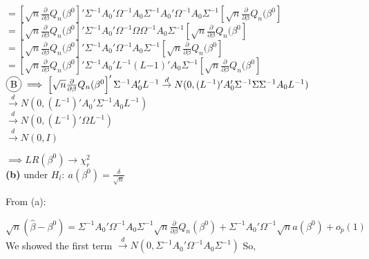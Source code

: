 \documentclass[11pt]{article}
\theoremstyle{definition}
\newcommand*\circled[1]{\tikz[baseline=(char.base)]{
            \node[shape=circle,draw,inner sep=2pt] (char) {#1};}}
\def\indist{\stackrel{d}{\rightarrow}}
\begin{document}
$=\left[\sqrt{n}\frac{\partial}{\partial \beta}Q_{n}(\beta^{0}\right]'\Sigma^{-1}A_{0}'\Omega^{-1}A_{0}\Sigma^{-1}A_{0}'\Omega^{-1}A_{0}\Sigma^{-1}\left[\sqrt{n}\frac{\partial}{\partial \beta}Q_{n}(\beta^{0}\right]$ \\

$=\left[\sqrt{n}\frac{\partial}{\partial \beta}Q_{n}(\beta^{0}\right]'\Sigma^{-1}A_{0}'\Omega^{-1}\Omega\Omega^{-1}A_{0}\Sigma^{-1}\left[\sqrt{n}\frac{\partial}{\partial \beta}Q_{n}(\beta^{0}\right]$ \\

$=\left[\sqrt{n}\frac{\partial}{\partial \beta}Q_{n}(\beta^{0}\right]'\Sigma^{-1}A_{0}'\Omega^{-1}A_{0}\Sigma^{-1}\left[\sqrt{n}\frac{\partial}{\partial \beta}Q_{n}(\beta^{0}\right]$ \\

$=\left[\sqrt{n}\frac{\partial}{\partial \beta}Q_{n}(\beta^{0}\right]'\Sigma^{-1}A_{0}'L^{-1}(L{-1})'A_{0}\Sigma^{-1}\left[\sqrt{n}\frac{\partial}{\partial \beta}Q_{n}(\beta^{0}\right]$ \\

$\circled{B} \implies\left[\sqrt{n}\frac{\partial}{\partial \beta}Q_{n}(\beta^{0}\right]'\Sigma^{-1}A_{0}'L^{-1} \indist N(0,(L^{-1})'A_{0}'\Sigma^{-1}\Sigma\Sigma^{-1}A_{0}L^{-1})$ \\

\hspace{61mm}$\indist N(0,(L^{-1})'A_{0}'\Sigma^{-1}A_{0}L^{-1})$ \\

\hspace{61mm}$\indist N(0,(L^{-1})'\Omega L^{-1})$ \\

\hspace{61mm}$\indist N(0,I)$ 

$\implies LR(\beta^{0}) \rightarrow \chi_{r}^{2}$ \\

\noindent
\textbf{(b)} under $H_{l}: \ a(\beta^{0})= \frac{\delta}{\sqrt{n}}$ 

From (a):

$\sqrt{n}(\hat{\beta}-\beta^{0})=\Sigma^{-1}A_{0}'\Omega^{-1}A_{0}\Sigma^{-1}\sqrt{n}\frac{\partial}{\partial \beta}Q_{n}(\beta^{0})+\Sigma^{-1}A_{0}'\Omega^{-1}\sqrt{n}a(\beta^{0})+o_{p}(1)$ \\ 

We showed the first term $\indist N(0, \Sigma^{-1}A_{0}'\Omega^{-1}A_{0}\Sigma^{-1})$ So, \\
\end{document}
